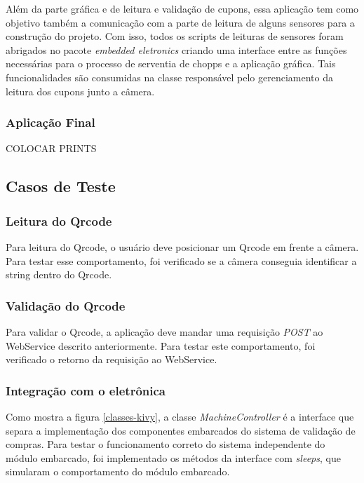 Além da parte gráfica e de leitura e validação de cupons, essa aplicação tem como objetivo
também a comunicação com a parte de leitura de alguns sensores para a construção do projeto.
Com isso, todos os scripts de leituras de sensores foram abrigados no pacote
\textit{embedded eletronics} criando uma interface entre as funções necessárias para o processo
de serventia de chopps e a aplicação gráfica. Tais funcionalidades são consumidas na classe
responsável pelo gerenciamento da leitura dos cupons junto a câmera.

\subsubsection{Aplicação Final}

COLOCAR PRINTS

\subsection{Casos de Teste}

\subsubsection{Leitura do Qrcode}

Para leitura do Qrcode, o usuário deve posicionar um Qrcode em frente a câmera.
Para testar esse comportamento, foi verificado se a câmera conseguia identificar a string dentro do Qrcode.

\subsubsection{Validação do Qrcode}

Para validar o Qrcode, a aplicação deve mandar uma requisição \textit{POST} ao WebService descrito anteriormente.
Para testar este comportamento, foi verificado o retorno da requisição ao WebService.

\subsubsection{Integração com o eletrônica}

Como mostra a figura \ref{classes-kivy}, a classe \textit{MachineController} é a interface que separa
a implementação dos componentes embarcados do sistema de validação de compras. Para testar o funcionamento
correto do sistema independente do módulo embarcado, foi implementado os métodos da interface com
\textit{sleeps}, que simularam o comportamento do módulo embarcado.

